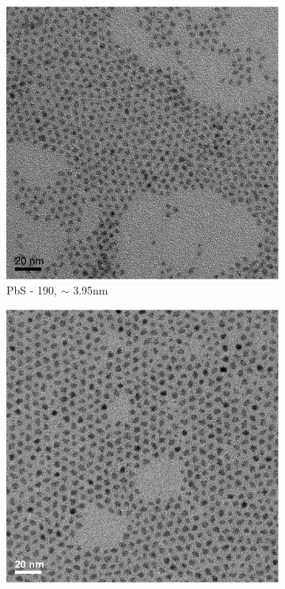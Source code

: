 	\begin{figure}[htpb]
		\centering
		\begin{subfigure}{0.23\textwidth}
			\includegraphics[width=\textwidth]{Fig/Plots/PbS_190_TEM.eps}
			\caption{PbS - 190, \diameter $\sim$ 3.95nm}
		\end{subfigure}
		\hfill   
		\begin{subfigure}{0.23\textwidth}
			\includegraphics[width=\textwidth]{Fig/Plots/PbS_220_TEM.eps}

\end{subfigure}
\end{figure}
